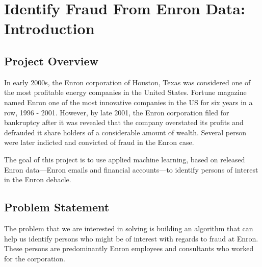 \documentclass[twoside,openright,titlepage,numbers=noenddot,headinclude,%
               footinclude=true,cleardoublepage=empty,abstractoff,BCOR=5mm,%
               paper=a4,fontsize=11pt,ngerman,american]{scrreprt}
\numberwithin{theorem}{chapter}
\numberwithin{definition}{chapter}
\numberwithin{algorithm}{chapter}
\numberwithin{figure}{chapter}
\numberwithin{table}{chapter}
\numberwithin{equation}{chapter}
\begin{document}
\frenchspacing
\raggedbottom
{}
\pagestyle{plain}






\cleardoublepage


\chapter*{Identify Fraud From Enron Data: Introduction}



\section*{Project Overview}

In early 2000s, the Enron corporation of Houston, Texas was considered one of the most profitable energy companies in the United States. Fortune magazine named Enron one of the most innovative companies in the US for six years in a row, 1996 - 2001. However, by late 2001, the Enron corporation filed for bankruptcy after it was revealed that the company overstated its profits and defrauded it share holders of a considerable amount of wealth. Several person were later indicted and convicted of fraud in the Enron case. 

The goal of this project is to use applied machine learning, based on released Enron data---Enron emails and financial accounts---to identify persons of interest in the Enron debacle.


\section*{Problem Statement}

The problem that we are interested in solving is building an algorithm that can help us identify persons who might be of interest with regards to fraud at Enron. These persons are predominantly Enron employees and consultants who worked for the corporation. 
\end{document}
